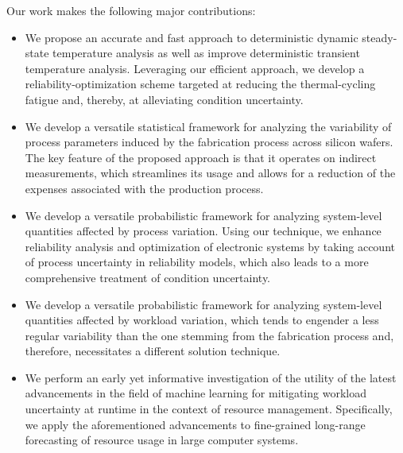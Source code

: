 Our work makes the following major contributions:

\begin{itemize}

\item
We propose an accurate and fast approach to deterministic dynamic steady-state
temperature analysis as well as improve deterministic transient temperature
analysis. Leveraging our efficient approach, we develop a
reliability-optimization scheme targeted at reducing the thermal-cycling fatigue
and, thereby, at alleviating condition uncertainty.

\item
We develop a versatile statistical framework for analyzing the variability of
process parameters induced by the fabrication process across silicon wafers. The
key feature of the proposed approach is that it operates on indirect
measurements, which streamlines its usage and allows for a reduction of the
expenses associated with the production process.

\item
We develop a versatile probabilistic framework for analyzing system-level
quantities affected by process variation. Using our technique, we enhance
reliability analysis and optimization of electronic systems by taking account of
process uncertainty in reliability models, which also leads to a more
comprehensive treatment of condition uncertainty.

\item
We develop a versatile probabilistic framework for analyzing system-level
quantities affected by workload variation, which tends to engender a less
regular variability than the one stemming from the fabrication process and,
therefore, necessitates a different solution technique.

\item
We perform an early yet informative investigation of the utility of the latest
advancements in the field of machine learning for mitigating workload
uncertainty at runtime in the context of resource management. Specifically, we
apply the aforementioned advancements to fine-grained long-range forecasting of
resource usage in large computer systems.

\end{itemize}

